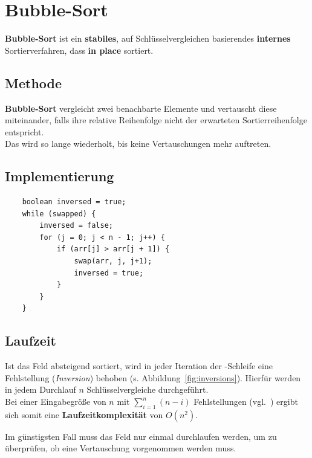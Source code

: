\section{Bubble-Sort}

\textbf{Bubble-Sort} ist ein \textbf{stabiles}, auf Schlüsselvergleichen basierendes \textbf{internes} Sortierverfahren, dass \textbf{in place} sortiert.

\subsection{Methode}
\textbf{Bubble-Sort} vergleicht zwei benachbarte Elemente und vertauscht diese miteinander, falls ihre relative Reihenfolge nicht der erwarteten Sortierreihenfolge entspricht.\\
Das wird so lange wiederholt, bis keine Vertauschungen mehr auftreten.\\

\subsection{Implementierung}

\begin{verbatim}
    boolean inversed = true;
    while (swapped) {
        inversed = false;
        for (j = 0; j < n - 1; j++) {
            if (arr[j] > arr[j + 1]) {
                swap(arr, j, j+1);
                inversed = true;
            }
        }
    }
\end{verbatim}

\subsection{Laufzeit}
Ist das Feld absteigend sortiert, wird in jeder Iteration der -Schleife eine Fehlstellung (\textit{Inversion}) behoben (s. Abbildung~\ref{fig:inversions}).
Hierfür werden in jedem Durchlauf $n$ Schlüsselvergleiche durchgeführt.\\
Bei einer Eingabegröße von $n$ mit $\sum_{i=1}^n (n-i)$  Fehlstellungen (vgl.~\cite[87]{OW17b}) ergibt sich somit eine \textbf{Laufzeitkomplexität} von $O(n^2)$.

\noindent
Im günstigsten Fall muss das Feld nur einmal durchlaufen werden, um zu überprüfen, ob eine Vertauschung vorgenommen werden muss.\\


